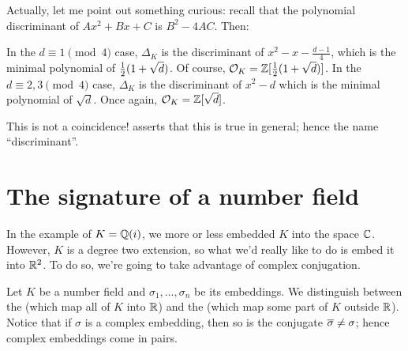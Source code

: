 Actually, let me point out something curious: recall that the polynomial discriminant of $Ax^2+Bx+C$ is $B^2-4AC$. Then:
\begin{itemize}
	\ii In the $d \equiv 1 \pmod 4$ case,
	$\Delta_K$ is the discriminant of $x^2 - x - \frac{d-1}{4}$,
	which is the minimal polynomial of $\frac{1}{2}(1+\sqrt d)$.
	Of course, $\mathcal O_K = \mathbb Z[\frac{1}{2}(1+\sqrt d)]$.
	\ii In the $d \equiv 2,3 \pmod 4$ case,
	$\Delta_K$ is the discriminant of $x^2 - d$
	which is the minimal polynomial of $\sqrt d$. Once again, $\mathcal O_K = \mathbb Z[\sqrt d]$.
\end{itemize}
This is not a coincidence!  asserts that this is true in general;
hence the name ``discriminant''.

\section{The signature of a number field}
In the example of $K = \mathbb Q(i)$,
we more or less embedded $K$ into the space $\mathbb C$.
However, $K$ is a degree two extension,
so what we'd really like to do is embed it into $\mathbb R^2$.
To do so, we're going to take advantage of complex conjugation.

Let $K$ be a number field and $\sigma_1, \dots, \sigma_n$ be its embeddings.
We distinguish between the 
(which map all of $K$ into $\mathbb R$)
and the 
(which map some part of $K$ outside $\mathbb R$).
Notice that if $\sigma$ is a complex embedding,
then so is the conjugate $\overline{\sigma} \neq \sigma$;
hence complex embeddings come in pairs.

